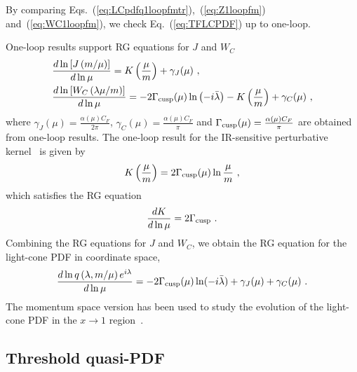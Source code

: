 \documentclass[a4paper,11pt]{article}
\begin{document}
By comparing Eqs.~(\ref{eq:LCpdfq1loopfmtr}),~(\ref{eq:Z1loopfm}) and~(\ref{eq:WC1loopfm}), we check Eq.~(\ref{eq:TFLCPDF}) up to one-loop. 

One-loop results support RG equations for $J$ and $W_C$ 
\begin{align}
&\frac{d \ln\left[J\left(m/\mu\right)\right]}{d \ln \mu} 
= K\left(\frac{\mu}{m}\right) + \gamma_{J}(\mu) \ , \\
&
\frac{d\ln \left[W_C\left( \lambda \mu/m \right)\right]}{d\ln \mu} = -2 \Gamma_{\rm cusp}(\mu) \ln\left(-i \bar{\lambda} \right) -K\left(\frac{\mu}{m}\right) + \gamma_{C}(\mu) 
\ , 
\end{align}
where $\gamma_{J}(\mu) = \frac{\alpha(\mu) C_F}{2\pi}$, $\gamma_C(\mu) = \frac{\alpha(\mu) C_F}{\pi}$ and $\Gamma_{\rm cusp}(\mu) = \frac{\alpha(\mu) C_F}{\pi}$ are obtained from one-loop results. The one-loop result for the IR-sensitive perturbative kernel~\cite{Collins:2011zzd} is given by
\begin{align}
K\left(\frac{\mu}{m}\right) =  2 \Gamma_{\rm cusp}(\mu) \ln\frac{\mu}{m} \ ,
\end{align}
which satisfies
the RG equation
\begin{equation}
    \frac{dK}{d\ln \mu} = 2\Gamma_{\rm cusp}\ . 
\end{equation}
Combining the RG equations for $J$ and $W_C$, we obtain the RG equation
for the light-cone PDF in coordinate space,
\begin{equation}
    \frac{d \ln q\left(\lambda,m/\mu\right)e^{i\lambda}}{d\ln \mu} = -2\Gamma_{\rm cusp}(\mu) \ln(-i\bar{\lambda}) + \gamma_J(\mu) + \gamma_C(\mu) \ .
\end{equation}
The momentum space version has been used to study the evolution of the light-cone PDF in the $x \rightarrow 1$ region~\cite{Becher:2006mr}.


\subsection{Threshold quasi-PDF}\label{sec:1loopfmq}
\end{document}
